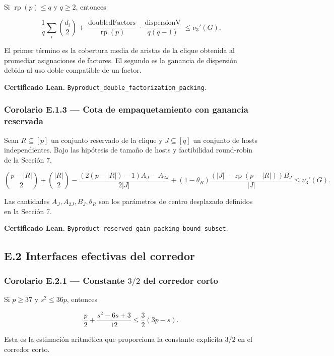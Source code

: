 \documentclass[
  spanish,
  11pt,
  a4paper,
]{article}
\begin{document}
Si \(\operatorname{rp}(p)\le q\) y \(q\ge2\), entonces

\[\frac1q\sum_i \binom{d_i}{2}+\frac{\operatorname{doubledFactors}}{\operatorname{rp}(p)}\cdot\frac{\operatorname{dispersionV}}{q(q-1)}\le \nu_3'(G).\]

El primer término es la cobertura media de aristas de la clique obtenida al promediar asignaciones de factores. El segundo es la ganancia de dispersión debida al uso doble compatible de un factor.

\textbf{Certificado Lean.} \texttt{Byproduct\_double\_factorization\_packing}.

\subsubsection{Corolario E.1.3 --- Cota de empaquetamiento con ganancia reservada}\label{corolario-e.1.3-cota-de-empaquetamiento-con-ganancia-reservada}

Sean \(R\subseteq[p]\) un conjunto reservado de la clique y \(J\subseteq[q]\) un conjunto de hosts independientes. Bajo las hipótesis de tamaño de hosts y factibilidad round-robin de la Sección 7,

\[\binom{p-|R|}{2}+\binom{|R|}{2}-\frac{(2(p-|R|)-1)A_J-A_{2J}}{2|J|}+(1-\theta_R)\frac{(|J|-\operatorname{rp}(p-|R|))B_J}{|J|}\le \nu_3'(G).\]

Las cantidades \(A_J,A_{2J},B_J,\theta_R\) son los parámetros de centro desplazado definidos en la Sección 7.

\textbf{Certificado Lean.} \texttt{Byproduct\_reserved\_gain\_packing\_bound\_subset}.

\subsection{E.2 Interfaces efectivas del corredor}\label{e.2-interfaces-efectivas-del-corredor}

\subsubsection{\texorpdfstring{Corolario E.2.1 --- Constante \(3/2\) del corredor corto}{Corolario E.2.1 --- Constante 3/2 del corredor corto}}\label{corolario-e.2.1-constante-32-del-corredor-corto}

Si \(p\ge37\) y \(s^2\le36p\), entonces

\[\frac p2+\frac{s^2-6s+3}{12}\le\frac32(3p-s).\]

Esta es la estimación aritmética que proporciona la constante explícita \(3/2\) en el corredor corto.
\end{document}
